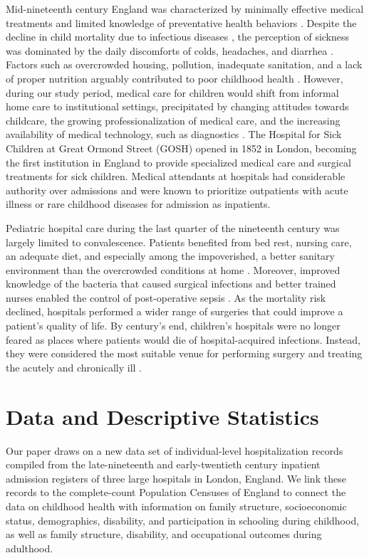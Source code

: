 \documentclass[12pt,english]{article}
\begin{document}
Mid-nineteenth century England was characterized by minimally effective medical treatments and limited knowledge of preventative health behaviors \citep{Mokyr2000,Worboys2000}. Despite the decline in child mortality due to infectious diseases \citep{Mercer2014},  the perception of sickness was dominated by the daily discomforts of colds, headaches, and diarrhea \citep{Hardy2001}. Factors such as overcrowded housing, pollution, inadequate sanitation, and a lack of proper nutrition arguably contributed to poor childhood health \citep{McKeown1976,Wohl1983,Szreter2005}. However, during our study period, medical care for children would shift from informal home care to institutional settings, precipitated by changing attitudes towards childcare, the growing professionalization of medical care, and the increasing availability of medical technology, such as diagnostics \citep{Lomax1996,Higgs2009}. The Hospital for Sick Children at Great Ormond Street (GOSH) opened in 1852 in London, becoming the first institution in England to provide specialized medical care and surgical treatments for sick children. Medical attendants at hospitals had considerable authority over admissions and were known to prioritize outpatients with acute illness or rare childhood diseases for admission as inpatients.

Pediatric hospital care during the last quarter of the nineteenth century was largely limited to convalescence. Patients benefited from bed rest, nursing care, an adequate diet, and especially among the impoverished, a better sanitary environment than the overcrowded conditions at home \citep{Higgs2009}. Moreover, improved knowledge of the bacteria that caused surgical infections and better trained nurses enabled the control of post-operative sepsis \citep{HawkinsTanner2013}. As the mortality risk declined, hospitals performed a wider range of surgeries that could improve a patient's quality of life. By century's end, children's hospitals were no longer feared as places where patients would die of hospital-acquired infections. Instead, they were considered the most suitable venue for performing surgery and treating the acutely and chronically ill \citep{Lomax1996}.

\section[Data and Descriptive Statistics]{Data and Descriptive Statistics\label{sec:Data}}

Our paper draws on a new data set of individual-level hospitalization records compiled from the late-nineteenth and early-twentieth century inpatient admission registers of three large hospitals in London, England. We link these records to the complete-count Population Censuses of England to connect the data on childhood health with information on family structure, socioeconomic status, demographics, disability, and participation in schooling during childhood, as well as family structure, disability, and occupational outcomes during adulthood.
\end{document}
